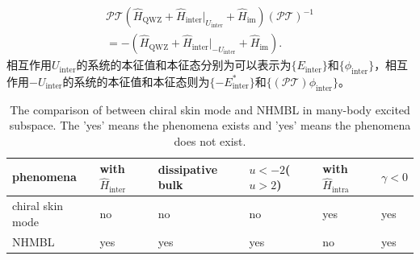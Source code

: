 \documentclass[longbibliography, aps, prx, amsmath, amssymb, amsfonts, twocolumn,superscriptaddress, footinbib]{revtex4-1}
\begin{document}
	\begin{equation}
		\begin{split}
			\mathcal{PT} (\hat{H}_{\text{QWZ}}+\hat{H}_{\text{inter}}\vert_{U_{\text{inter}}}+\hat{H}_{\text{im}}) (\mathcal{PT})^{-1}\\
			= -(\hat{H}_{\text{QWZ}}+\hat{H}_{\text{inter}}\vert_{-U_{\text{inter}}}+\hat{H}_{\text{im}}).
		\end{split}
	\end{equation}
	相互作用$U_{\text{inter}}$的系统的本征值和本征态分别为可以表示为$\{E_{\text{inter}}\}$和$\{\phi_{\text{inter}}\}$，相互作用$-U_{\text{inter}}$的系统的本征值和本征态则为$\{-E^*_{\text{inter}}\}$和$\{(\mathcal{PT})\phi_{\text{inter}}\}$。
	\begin{table}[htbp]
		\centering
		\caption{The comparison of between chiral skin mode and NHMBL in many-body excited subspace. The 'yes' means the phenomena exists and 'yes' means the phenomena does not exist. }
		\begin{tabular}{l|p{2cm}p{3cm}p{3cm}p{2cm}p{2cm}}
		\hline
		  phenomena & with $\hat{H}_{\text{inter}}$ & dissipative bulk & $u<-2$($u>2$) & with $\hat{H}_{\text{intra}}$ & $\gamma<0$\\
		\hline
		  chiral skin mode & no & no & no & yes & yes\\
		  NHMBL & yes & yes & yes & no & yes\\
		\hline
		\end{tabular}
		\label{tab:example}
	\end{table}
\end{document}
